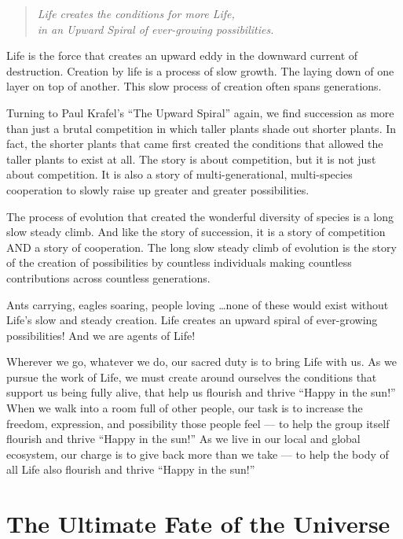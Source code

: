 \documentclass[ebook,11pt,openany,twoside]{memoir}
\begin{document}
\begin{verse}
\begin{patverse}
\em
Life creates the conditions for more Life,\\
in an Upward Spiral of ever-growing possibilities.\\
\end{patverse}
\end{verse}

Life is the force that creates an upward eddy in the downward current of
destruction. Creation by life is a process of slow growth. The laying down of
one layer on top of another. This slow process of creation often spans
generations.

Turning to Paul Krafel's ``The Upward Spiral'' again, we find succession as
more than just a brutal competition in which taller plants shade out shorter
plants. In fact, the shorter plants that came first created the conditions that
allowed the taller plants to exist at all. The story is about competition, but
it is not just about competition. It is also a story of multi-generational,
multi-species cooperation to slowly raise up greater and greater possibilities.

The process of evolution that created the wonderful diversity of species is a
long slow steady climb. And like the story of succession, it is a story of
competition AND a story of cooperation. The long slow steady climb of evolution
is the story of the creation of possibilities by countless individuals making
countless contributions across countless generations.

Ants carrying, eagles soaring, people loving \ldots none of these would exist
without Life's slow and steady creation. Life creates an upward spiral of
ever-growing possibilities! And we are agents of Life!

Wherever we go, whatever we do, our sacred duty is to bring Life with us. As we
pursue the work of Life, we must create around ourselves the conditions that
support us being fully alive, that help us flourish and thrive ``Happy in the
sun!'' When we walk into a room full of other people, our task is to increase
the freedom, expression, and possibility those people feel --- to help the
group itself flourish and thrive ``Happy in the sun!'' As we live in our local
and global ecosystem, our charge is to give back more than we take --- to help
the body of all Life also flourish and thrive ``Happy in the sun!''

\section*{The Ultimate Fate of the Universe}
\end{document}
